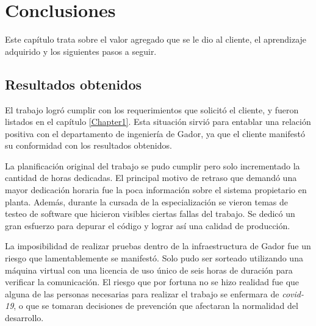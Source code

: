 
\chapter{Conclusiones} %

\label{Chapter5} %




Este capítulo trata sobre el valor agregado que se le dio al cliente, el aprendizaje adquirido y los siguientes pasos a seguir.

\section{Resultados obtenidos}

El trabajo logró cumplir con los requerimientos que solicitó el cliente, y fueron listados en el capítulo \ref{Chapter1}.
Esta situación sirvió para entablar una relación positiva con el departamento de ingeniería de Gador, ya que el cliente manifestó su conformidad con los resultados obtenidos.

La planificación original del trabajo se pudo cumplir pero solo incrementado la cantidad de horas dedicadas.
El principal motivo de retraso que demandó una mayor dedicación horaria fue la poca información sobre el sistema propietario en planta.
Además, durante la cursada de la especialización se vieron temas de testeo de software que hicieron visibles ciertas fallas del trabajo.
Se dedicó un gran esfuerzo para depurar el código y lograr así una calidad de producción.

La imposibilidad de realizar pruebas dentro de la infraestructura de Gador fue un riesgo que lamentablemente se manifestó.
Solo pudo ser sorteado utilizando una máquina virtual con una licencia de uso único de seis horas de duración para verificar la comunicación.
El riesgo que por fortuna no se hizo realidad fue que alguna de las personas necesarias para realizar el trabajo se enfermara de \emph{covid-19}, o que se tomaran decisiones de prevención que afectaran la normalidad del desarrollo.

